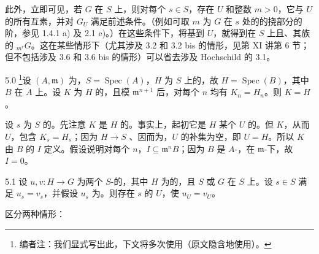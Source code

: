 此外，立即可见，若 $G$ 在 $S$ 上，则对每个 $s\in S$，存在 $U$ 和整数 $m>0$，它与 $U$ 的所有互素，并对 $G_U$ 满足前述条件。（例如可取 $m$ 为 $G$ 在 $s$ 处的的挠部分的阶，参见 1.4.1 a) 及 2.1 e)。）在这些条件下，将基到 $U$，就得到在 $S$ 上且、其族的 ${}_{m^r}G$。这在某些情形下（尤其涉及 3.2 和 3.2 bis 的情形，见第 XI 讲第 6 节；但不包括涉及 3.6 和 3.6 bis 的情形）可以省去涉及 Hochschild 的 3.1。
\begin{SGAresult}{}{5.0}
\footnote{编者注：我们显式写出此，下文将多次使用（原文隐含地使用）。}设 $(A,\mathfrak m)$ 为，$S=\operatorname{Spec}(A)$，$H$ 为 $S$ 上的，故 $H=\operatorname{Spec}(B)$，其中 $B$ 在 $A$ 上。设 $K$ 为 $H$ 的，且模 $\mathfrak m^{n+1}$ 后，对每个 $n$ 均有 $K_n=H_n$。则 $K=H$。
\end{SGAresult}
设 $s$ 为 $S$ 的。先注意 $K$ 是 $H$ 的。事实上，起初它是 $H$ 某个 $U$ 的。但 $K$，从而 $U$，包含 $K_s=H_s$；因为 $H\to S$ 、因而为，$U$ 的补集为空，即 $U=H$。所以 $K$ 由 $B$ 的 $I$ 定义。假设说明对每个 $n$，$I\subseteq\mathfrak m^nB$；因为 $B$ 是 $A$-，在 $\mathfrak m$-下，故 $I=0$。
\begin{SGAresult}{}{5.1}
设 $u,v:H\to G$ 为两个 $S$-的，其中 $H$ 为的，且 $S$ 或 $G$ 在 $S$ 上。设 $s\in S$ 满足 $u_s=v_s$，并假设 $u_s$ 为。则存在 $s$ 的 $U$，使 $u_U=v_U$。
\end{SGAresult}
区分两种情形：

